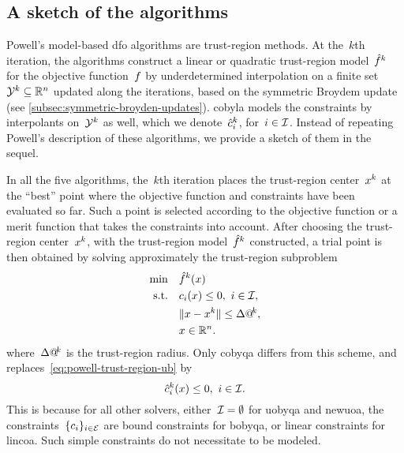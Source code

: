 \subsection{A sketch of the algorithms}

Powell's model-based \gls{dfo} algorithms are trust-region methods.
At the~$k$th iteration, the algorithms construct a linear or quadratic trust-region model~$\objm[k]$ for the objective function~$f$ by underdetermined interpolation on a finite set~$\xpt[k] \subseteq \R^n$ updated along the iterations, based on the symmetric Broydem update (see \cref{subsec:symmetric-broyden-updates}).
\Gls{cobyla} models the constraints by interpolants on~$\xpt[k]$ as well, which we denote~$\conm[k]{i}$, for~$i \in \mathcal{I}$.
Instead of repeating Powell's description of these algorithms, we provide a sketch of them in the sequel.

In all the five algorithms, the~$k$th iteration places the trust-region center~$\iter[k]$ at the \enquote{best} point where the objective function and constraints have been evaluated so far.
Such a point is selected according to the objective function or a merit function that takes the constraints into account.
After choosing the trust-region center~$\iter[k]$, with the trust-region model~$\objm[k]$ constructed, a trial point is then obtained by solving approximately the trust-region subproblem
\begin{subequations}
    \label{eq:powell-trust-region}
    \begin{align}
        \min        & \quad \objm[k](\iter)\\
        \text{s.t.} & \quad \con{i}(\iter) \le 0, ~ i \in \iub, \label{eq:powell-trust-region-ub}\\
                    & \quad \norm{\iter - \iter[k]} \le \rad[k],\\
                    & \quad \iter \in \R^n. \nonumber
    \end{align}
\end{subequations}
where~$\rad[k]$ is the trust-region radius.
Only \gls{cobyqa} differs from this scheme, and replaces~\cref{eq:powell-trust-region-ub} by
\begin{equation*}
    \conm[k]{i}(\iter) \le 0, ~ i \in \iub.
\end{equation*}
This is because for all other solvers, either~$\mathcal{I} = \emptyset$ for \gls{uobyqa} and \gls{newuoa}, the constraints~$\{c_{i}\}_{i \in \mathcal{E}}$ are bound constraints for \gls{bobyqa}, or linear constraints for \gls{lincoa}.
Such simple constraints do not necessitate to be modeled.

